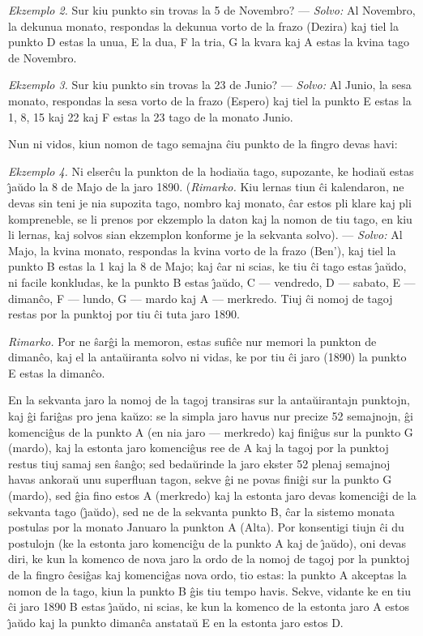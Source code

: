 {\sl Ekzemplo 2.} Sur kiu punkto sin trovas la 5 de Novembro?
 --- {\sl Solvo:} Al Novembro, la dekunua monato, respondas la dekunua vorto
de la frazo (Dezira) kaj tiel la punkto D estas la unua, E la dua, F
la tria, G la kvara kaj A estas la kvina tago de Novembro.

{\sl Ekzemplo 3.} Sur kiu punkto sin trovas la 23 de Junio?
--- {\sl Solvo:} Al Junio, la sesa monato, respondas la sesa vorto de la
frazo (Espero) kaj tiel la punkto E estas la 1, 8, 15 kaj 22 kaj F
estas la 23 tago de la monato Junio.

   Nun ni vidos, kiun nomon de tago semajna \^ciu punkto de la fingro
devas havi:

{\sl Ekzemplo 4.} Ni elser\^cu la punkton de la hodia\u ua tago,
supozante, ke hodia\u u estas \^{\j}a\u udo la 8 de Majo de la jaro
1890. ({\it Rimarko.} Kiu lernas tiun \^ci kalendaron, ne devas sin
teni je nia supozita tago, nombro kaj monato, \^car estos pli klare
kaj pli kompreneble, se li prenos por ekzemplo la daton kaj la nomon
de tiu tago, en kiu li lernas, kaj solvos sian ekzemplon konforme je
la sekvanta solvo).
--- {\sl Solvo:} Al Majo, la kvina monato, respondas
la kvina vorto de la frazo (Ben'), kaj tiel la punkto B estas la 1
kaj la 8 de Majo; kaj \^car ni scias, ke tiu \^ci tago estas
\^{\j}a\u udo, ni facile konkludas, ke la punkto B estas \^{\j}a\u
udo, C --- vendredo, D --- sabato, E --- diman\^co, F --- lundo, G
--- mardo kaj A --- merkredo. Tiuj \^ci nomoj de tagoj restas por la
punktoj por tiu \^ci tuta jaro 1890.

{\it Rimarko.} Por ne \^sar\^gi la memoron, estas sufi\^ce nur
memori la punkton de diman\^co, kaj el la anta\u uiranta solvo ni
vidas, ke por tiu \^ci jaro (1890) la punkto E estas la diman\^co.

   En la sekvanta jaro la nomoj de la tagoj transiras sur la
anta\u uirantajn punktojn, kaj \^gi fari\^gas pro jena ka\u uzo: se
la simpla jaro havus nur precize 52 semajnojn, \^gi komenci\^gus de
la punkto A (en nia jaro --- merkredo) kaj fini\^gus sur la punkto G
(mardo), kaj la estonta jaro komenci\^gus ree de A kaj la tagoj por
la punktoj restus tiuj samaj sen \^san\^go; sed beda\u urinde la
jaro ekster 52 plenaj semajnoj havas ankora\u u unu superfluan
tagon, sekve \^gi ne povas fini\^gi sur la punkto G (mardo), sed
\^gia fino estos A (merkredo) kaj la estonta jaro devas komenci\^gi
de la sekvanta tago (\^{\j}a\u udo), sed ne de la sekvanta punkto B,
\^car la sistemo monata postulas por la monato Januaro la punkton A
(Alta). Por konsentigi tiujn \^ci du postulojn (ke la estonta jaro
komenci\^gu de la punkto A kaj de \^{\j}a\u udo), oni devas diri, ke
kun la komenco de nova jaro la ordo de la nomoj de tagoj por la
punktoj de la fingro \^cesi\^gas kaj komenci\^gas nova ordo, tio
estas: la punkto A akceptas la nomon de la tago, kiun la punkto B
\^gis tiu tempo havis. Sekve, vidante ke en tiu \^ci jaro 1890 B
estas \^{\j}a\u udo, ni scias, ke kun la komenco de la estonta jaro
A estos \^{\j}a\u udo kaj la punkto diman\^ca anstata\u u E en la
estonta jaro estos D.

